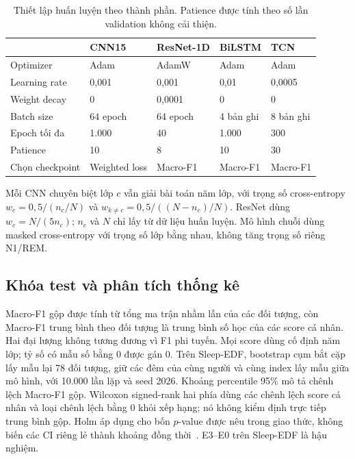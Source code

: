 \documentclass[10pt,a4paper]{article}
\begin{document}
\begin{table}[t]
\centering
\caption{Thiết lập huấn luyện theo thành phần. Patience được tính theo số lần validation không cải thiện.}
\label{tab:training-settings}
\small
\begin{tabularx}{\textwidth}{lYYYY}
\toprule
 & \textbf{CNN15} & \textbf{ResNet-1D} & \textbf{BiLSTM} & \textbf{TCN} \\
\midrule
Optimizer & Adam & AdamW & Adam & Adam \\
Learning rate & 0,001 & 0,001 & 0,01 & 0,0005 \\
Weight decay & 0 & 0,0001 & 0 & 0 \\
Batch size & 64 epoch & 64 epoch & 4 bản ghi & 8 bản ghi \\
Epoch tối đa & 1.000 & 40 & 1.000 & 300 \\
Patience & 10 & 8 & 10 & 30 \\
Chọn checkpoint & Weighted loss & Macro-F1 & Macro-F1 & Macro-F1 \\
\bottomrule
\end{tabularx}
\end{table}

Mỗi CNN chuyên biệt lớp $c$ vẫn giải bài toán năm lớp, với trọng số cross-entropy $w_c=0,5/(n_c/N)$ và $w_{k\ne c}=0,5/((N-n_c)/N)$. ResNet dùng $w_c=N/(5n_c)$; $n_c$ và $N$ chỉ lấy từ dữ liệu huấn luyện. Mô hình chuỗi dùng masked cross-entropy với trọng số lớp bằng nhau, không tăng trọng số riêng N1/REM.

\subsection{Khóa test và phân tích thống kê}

Macro-F1 gộp được tính từ tổng ma trận nhầm lẫn của các đối tượng, còn Macro-F1 trung bình theo đối tượng là trung bình số học của các score cá nhân. Hai đại lượng không tương đương vì F1 phi tuyến. Mọi score dùng cố định năm lớp; tỷ số có mẫu số bằng 0 được gán 0. Trên Sleep-EDF, bootstrap cụm bắt cặp lấy mẫu lại 78 đối tượng, giữ các đêm của cùng người và cùng index lấy mẫu giữa mô hình, với 10.000 lần lặp và seed 2026. Khoảng percentile 95\% mô tả chênh lệch Macro-F1 gộp. Wilcoxon signed-rank hai phía dùng các chênh lệch score cá nhân và loại chênh lệch bằng 0 khỏi xếp hạng; nó không kiểm định trực tiếp trung bình gộp. Holm áp dụng cho bốn $p$-value được nêu trong giao thức, không biến các CI riêng lẻ thành khoảng đồng thời~\cite{efron1994bootstrap,wilcoxon1945,holm1979}. E3--E0 trên Sleep-EDF là hậu nghiệm.
\end{document}
